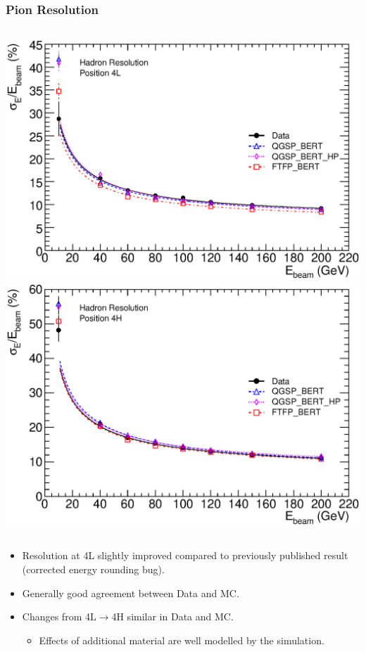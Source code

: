 \documentclass[10pt]{beamer}
\begin{document}
\begin{frame}\frametitle{Pion Resolution}
\begin{columns}
\includegraphics[width=0.95\linewidth,angle=0]{FCalTB_plots/hadron_resolution_4L.eps}
\includegraphics[width=0.95\linewidth,angle=0]{FCalTB_plots/hadron_resolution_4H.eps}
\end{columns}
\begin{itemize}
\item Resolution at 4L slightly improved compared to previously published result (corrected energy rounding bug).
\item Generally good agreement between Data and MC.
\item Changes from 4L$\rightarrow$4H similar in Data and MC.
\begin{itemize}
\item Effects of additional material are well modelled by the simulation.
\end{itemize}
\end{itemize}
\end{frame}
\end{document}
